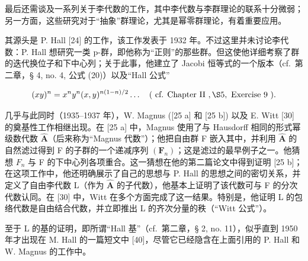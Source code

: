 
最后还需谈及一系列关于李代数的工作，其中李代数与李群理论的联系十分微弱；另一方面，这些研究对于“抽象”群理论，尤其是幂零群理论，有着重要应用。

其源头是 P. Hall {[}24{]} 的工作，该工作发表于 1932 年。不过这里并未讨论李代数：P. Hall 想研究一类 p-群，即他称为“正则”的那些群。但这使他详细考察了群的迭代换位子和下中心列；关于此事，他建立了 Jacobi 恒等式的一个版本（cf.~第二章，§ 4, no. 4, 公式 (20)）以及“Hall 公式”

\[
(x y) ^ {n} = x ^ {n} y ^ {n} (x, y) ^ {n (1 - n) / 2} \dots \quad (\text { cf.   Chapter   II }, \S 5, \text { Exercise   9 }).
\]

几乎与此同时（1935--1937 年），W. Magnus ({[}25 a{]} 和 {[}25 b{]}) 以及 E. Witt {[}30{]} 的奠基性工作相继出现。在 {[}25 a{]} 中，Magnus 使用了与 Hausdorff 相同的形式幂级数代数 \(\hat{\mathbf{A}}\)（后来称为“Magnus 代数”）；他把自由群 F 嵌入其中，并利用 \(\hat{\mathbf{A}}\) 的自然滤过得到 F 的子群的一个递减序列 \((\mathbf{F}_{n})\)；这是滤过的最早例子之一。他猜想 \(F_{n}\) 与 F 的下中心列各项重合。这一猜想在他的第二篇论文中得到证明 {[}25 b{]}；在这项工作中，他还明确展示了自己的思想与 P. Hall 的思想之间的密切关系，并定义了自由李代数 L（作为 \(\hat{\mathbf{A}}\) 的子代数），他基本上证明了该代数可与 F 的分次代数认同。在 {[}30{]} 中，Witt 在多个方面完成了这一结果。特别是，他证明 L 的包络代数是自由结合代数，并立即推出 L 的齐次分量的秩（“Witt 公式”）。

至于 L 的基的证明，即所谓“Hall 基”（cf.~第二章，§ 2, no. 11），似乎直到 1950 年才出现在 M. Hall 的一篇短文中 {[}40{]}，尽管它已经隐含在上面引用的 P. Hall 和 W. Magnus 的工作中。

